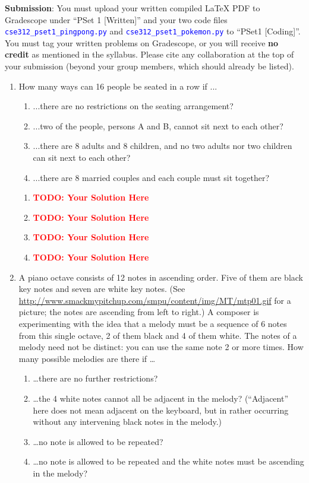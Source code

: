 \documentclass[12pt]{article}
\def\code#1{\textcolor{blue}{\texttt{#1}}}
\def\todo#1{\textcolor{red}{\textbf{#1}}}
\renewcommand{\|}{\mid}
\begin{document}
\textbf{Submission}: You must upload your written compiled LaTeX PDF to Gradescope under ``PSet 1 [Written]'' and your two code files \code{cse312\_pset1\_pingpong.py} and \code{cse312\_pset1\_pokemon.py}  to ``PSet1 [Coding]''. You must tag your written problems on Gradescope, or you will receive \textbf{no credit} as mentioned in the syllabus. Please cite any collaboration at the top of your submission (beyond your group members, which should already be listed).

\begin{enumerate}
\item How many ways can 16 people be seated in a row if ...
\begin{enumerate}
    \item ...there are no restrictions on the seating arrangement?
    \item ...two of the people, persons A and B, cannot sit next to each other?
    \item ...there are 8 adults and 8 children, and no two adults nor two children can sit next to each other?
    \item ...there are 8 married couples and each couple must sit together?
\end{enumerate}

\begin{tcolorbox}
\begin{enumerate}
\item \todo{TODO: Your Solution Here}
\item \todo{TODO: Your Solution Here}
\item \todo{TODO: Your Solution Here}
\item \todo{TODO: Your Solution Here}
\end{enumerate}
\end{tcolorbox}

    \item A piano octave consists of 12 notes in ascending order.  Five of
  them are black key notes and seven are white key notes.  (See
  \url{http://www.smackmypitchup.com/smpu/content/img/MT/mtp01.gif}
  for a picture; the notes are ascending from left to right.)  A
  composer is experimenting with the idea that a melody
  must be a sequence of 6 notes from this single octave, 2 of them
  black and 4 of them white.  The notes of a melody need not be
  distinct: you can use the same note 2 or more times.  How many
  possible melodies are there if \ldots
\begin{enumerate}
\item \ldots there are no further restrictions? 
\item \ldots the 4 white notes cannot all be adjacent in the melody?
  (``Adjacent'' here does not mean adjacent on the keyboard, but in
  rather occurring without any intervening black notes in the melody.)
\item \ldots no note is allowed to be repeated?
\item \ldots no note is allowed to be repeated and the white notes must be
   ascending in the melody?
\end{enumerate}



\end{enumerate}
\end{document}
